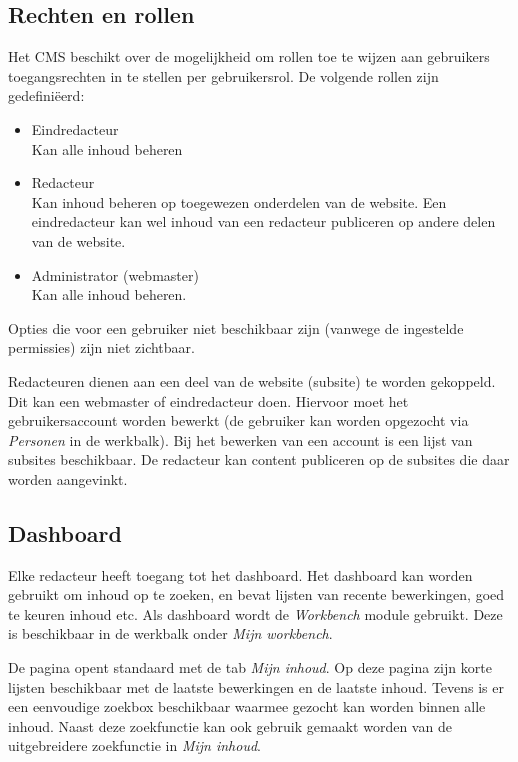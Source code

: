\subsection{Rechten en rollen}


Het CMS beschikt over de mogelijkheid om rollen toe te wijzen aan gebruikers toegangsrechten in te stellen per gebruikersrol. De volgende rollen zijn gedefini\"{e}erd:
\begin{itemize}
\item Eindredacteur \\ Kan alle inhoud beheren
\item Redacteur \\ Kan inhoud beheren op toegewezen onderdelen van de website. Een eindredacteur kan wel inhoud van een redacteur publiceren op andere delen van de website.
\item Administrator (webmaster) \\ Kan alle inhoud beheren.
\end{itemize}
Opties die voor een gebruiker niet beschikbaar zijn (vanwege de ingestelde permissies) zijn niet zichtbaar.

Redacteuren dienen aan een deel van de website (subsite) te worden gekoppeld. Dit kan een webmaster of eindredacteur doen. Hiervoor moet het gebruikersaccount worden bewerkt (de gebruiker kan worden opgezocht via \emph{Personen} in de werkbalk).  Bij het bewerken van een account is een lijst van subsites beschikbaar. De redacteur kan content publiceren op de subsites die daar worden aangevinkt.

\subsection{Dashboard}\label{dashboard}
Elke redacteur heeft toegang tot het dashboard. Het dashboard kan worden gebruikt om inhoud op te zoeken, en bevat lijsten van recente bewerkingen, goed te keuren inhoud etc. Als dashboard wordt de \emph{Workbench} module gebruikt. Deze is beschikbaar in de werkbalk onder \emph{Mijn workbench}.

De pagina opent standaard met de tab \emph{Mijn inhoud}. Op deze pagina zijn korte lijsten beschikbaar met de laatste bewerkingen en de laatste inhoud. Tevens is er een eenvoudige zoekbox beschikbaar waarmee gezocht kan worden binnen alle inhoud. Naast deze zoekfunctie kan ook gebruik gemaakt worden van de uitgebreidere zoekfunctie in \emph{Mijn inhoud}.

